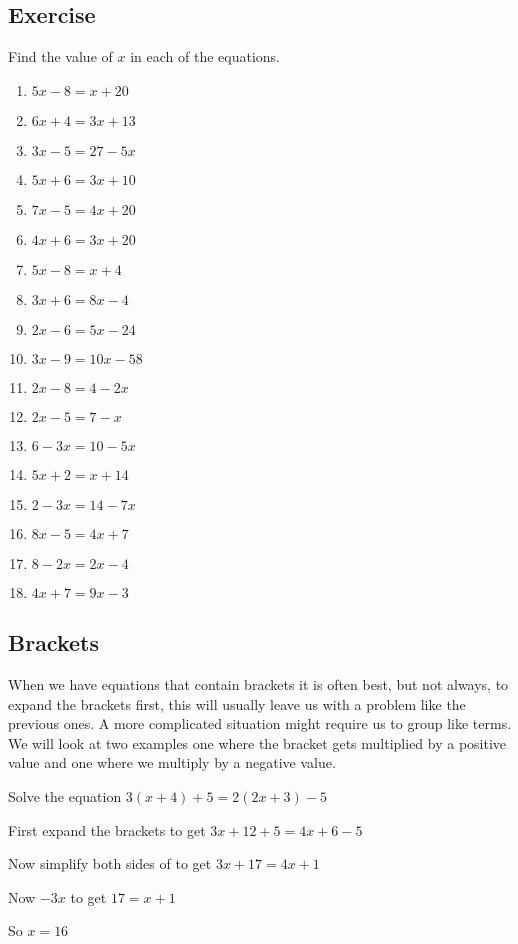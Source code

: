 \subsection{Exercise}
Find the value of $x$ in each of the equations.
\begin{multicols}{2}
\begin{enumerate}
	\item $5x-8=x+20$
	\item $6x+4=3x+13$
	\item $3x-5=27-5x$
	\item $5x+6=3x+10$
	\item $7x-5=4x+20$
	\item $4x+6=3x+20$
	\item $5x-8=x+4$
	\item $3x+6=8x-4$
	\item $2x-6=5x-24$
	\item $3x-9=10x-58$
	\item $2x-8=4-2x$
	\item $2x-5=7-x$
	\item $6-3x=10-5x$
	\item $5x+2=x+14$
	\item $2-3x=14-7x$
	\item $8x-5=4x+7$
	\item $8-2x=2x-4$
	\item $4x+7=9x-3$
\end{enumerate}
\end{multicols}
\subsection{Brackets}
When we have equations that contain brackets it is often best, but not always, to expand the brackets first, this will usually leave us with a problem like the previous ones.  A more complicated situation might require us to group like terms.  We will look at two examples one where the bracket gets multiplied by a positive value and one where we multiply by a negative value.

\begin{exmp}
Solve the equation $3(x+4)+5=2(2x+3)-5$

\bigskip

First expand the brackets to get $3x+12+5=4x+6-5$

\bigskip

Now simplify both sides of to get $3x+17=4x+1$

\bigskip

Now $-3x$ to get $17=x+1$

\bigskip

So $x=16$
\end{exmp}

